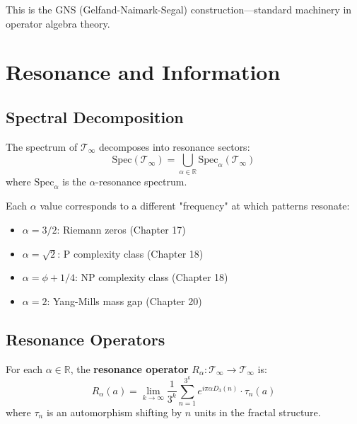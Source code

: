\begin{defn}
This is the GNS (Gelfand-Naimark-Segal) construction—standard machinery in operator algebra theory\cite{takesaki_theory_2002}.

\section{Resonance and Information}
\label{sec:resonance-info}

\subsection{Spectral Decomposition}

\begin{thm}\label{thm:spectral-decomp}
The spectrum of $\mathcal{T}_\infty$ decomposes into resonance sectors:
\begin{equation}
\text{Spec}(\mathcal{T}_\infty) = \bigcup_{\alpha \in \mathbb{R}} \text{Spec}_\alpha(\mathcal{T}_\infty)
\end{equation}
where $\text{Spec}_\alpha$ is the $\alpha$-resonance spectrum.
\end{thm}

Each $\alpha$ value corresponds to a different "frequency" at which patterns resonate:
\begin{itemize}
\item $\alpha = 3/2$: Riemann zeros (Chapter 17)
\item $\alpha = \sqrt{2}$: P complexity class (Chapter 18)
\item $\alpha = \phi + 1/4$: NP complexity class (Chapter 18)
\item $\alpha = 2$: Yang-Mills mass gap (Chapter 20)
\end{itemize}

\subsection{Resonance Operators}

\begin{defn}\label{def:resonance-operator}
For each $\alpha \in \mathbb{R}$, the \textbf{resonance operator} $R_\alpha: \mathcal{T}_\infty \to \mathcal{T}_\infty$ is:
\begin{equation}
R_\alpha(a) = \lim_{k \to \infty} \frac{1}{3^k} \sum_{n=1}^{3^k} e^{i\pi\alpha D_3(n)} \cdot \tau_n(a)
\end{equation}
where $\tau_n$ is an automorphism shifting by $n$ units in the fractal structure.
\end{defn}


\end{defn}
